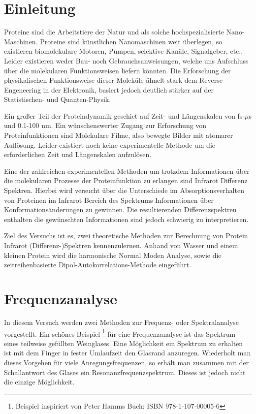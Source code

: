 \documentclass[a4paper,12pt]{article}
\begin{document}
\section*{Einleitung}
Proteine sind die Arbeitstiere der Natur und als solche hochspezialisierte Nano-Maschinen. 
Proteine sind k\"unstlichen Nanomaschinen weit überlegen, so existieren biomolekulare Motoren, Pumpen, selektive Kanäle, Signalgeber, etc.. 
Leider existieren weder Bau- noch Gebrauchsanweisungen, welche uns Aufschluss \"uber die molekularen Funktionsweisen liefern könnten. 
Die Erforschung der physikalischen Funktionsweise dieser Moleküle ähnelt stark dem Reverse-Engeneering in der Elektronik, basiert jedoch 
deutlich stärker auf der Statistischen- und Quanten-Physik.

Ein großer Teil der Proteindynamik geschiet auf Zeit- und L\"angenskalen von fs-$\mu$s und 0.1-100 nm. Ein w\"unschenswerter Zugang zur 
Erforschung von Proteinfunktionen sind Molekulare Filme, also bewegte Bilder mit atomarer Aufl\"osung. Leider existiert noch 
keine experimentelle Methode um die erforderlichen Zeit und L\"angenskalen aufzul\"osen.

Eine der zahlreichen experimentellen Methoden um trotzdem Informationen über die molekularen Prozesse der Proteinfunktion zu erlangen sind 
Infrarot Differenz Spektren. Hierbei wird versucht über die Unterschiede im Absorptionsverhalten von Proteinen im Infrarot Bereich des Spektrums 
Informationen über Konformationsänderungen zu gewinnen. Die resultierenden Differenzspektren enthalten die gewünschten Informationen sind 
jedoch schwierig zu interpretieren.

Ziel des Versuchs ist es, zwei theoretische Methoden zur Berechnung von Protein Infrarot (Differenz-)Spektren kennenzulernen. Anhand von Wasser 
und einem kleinen Protein wird die harmonische Normal Moden Analyse, sowie die zeitreihenbasierte Dipol-Autokorrelations-Methode eingeführt. 

\section{Frequenzanalyse} 
In diesem Versuch werden zwei Methoden zur Frequenz- oder Spektralanalyse vorgestellt. Ein schönes Beispiel \footnote{Beispiel inspiriert von Peter Hamms Buch: ISBN 978-1-107-00005-6}
für eine Frequenzanalyse ist das Spektrum eines teilweise gefüllten Weinglases. Eine Möglichkeit ein Spektrum zu erhalten ist mit dem Finger in
fester Umlaufzeit den Glasrand anzuregen. Wiederholt man dieses Vorgehen für viele Anregungsfrequenzen, so erhält man zusammen mit der Schallantwort
des Glases ein Resonanzfrequenzspektrum. Dieses ist jedoch nicht die einzige Möglichkeit. 
\end{document}
